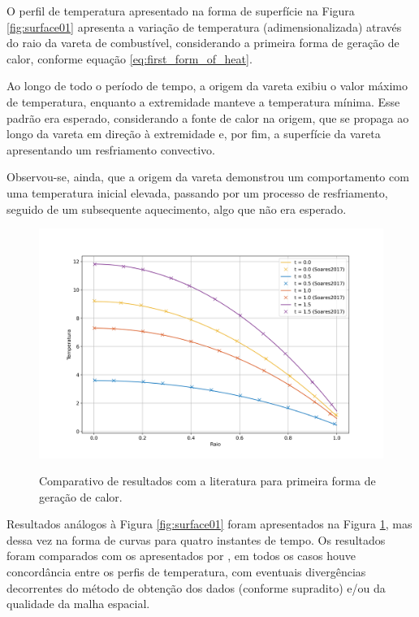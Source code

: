 O perfil de temperatura apresentado na forma de superfície na Figura \ref{fig:surface01} apresenta a variação de temperatura (adimensionalizada) através do raio da vareta de combustível, considerando a primeira forma de geração de calor, conforme equação \ref{eq:first_form_of_heat}.

Ao longo de todo o período de tempo, a origem da vareta exibiu o valor máximo de temperatura, enquanto a extremidade manteve a temperatura mínima. Esse padrão era esperado, considerando a fonte de calor na origem, que se propaga ao longo da vareta em direção à extremidade e, por fim, a superfície da vareta apresentando um resfriamento convectivo.

Observou-se, ainda, que a origem da vareta demonstrou um comportamento com uma temperatura inicial elevada, passando por um processo de resfriamento, seguido de um subsequente aquecimento, algo que não era esperado.

\begin{figure}[H]
    \centering
    \caption{Comparativo de resultados com a literatura para primeira forma de geração de calor.}    
    \includegraphics[scale=0.5]{figures/results/Fig03.png}
    \label{fig:profile01}
\end{figure}

Resultados análogos à Figura \ref{fig:surface01} foram apresentados na Figura \ref{fig:profile01}, mas dessa vez na forma de curvas para quatro instantes de tempo. Os resultados foram comparados com os apresentados por \citet{soares2017}, em todos os casos houve concordância entre os perfis de temperatura, com eventuais divergências decorrentes do método de obtenção dos dados (conforme supradito) e/ou da qualidade da malha espacial.

